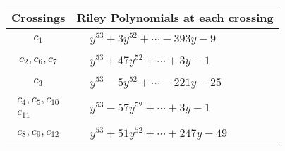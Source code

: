 \documentclass[1p]{elsarticle_modified}
\theoremstyle{definition}
\begin{document}
\begin{tabular}{m{50pt}|m{274pt}}
Crossings & \hspace{64pt}Riley Polynomials at each crossing \\
\hline $$\begin{aligned}c_{1}\end{aligned}$$&$\begin{aligned}
&y^{53}+3 y^{52}+\cdots-393 y-9
\end{aligned}$\\
\hline $$\begin{aligned}c_{2},c_{6},c_{7}\end{aligned}$$&$\begin{aligned}
&y^{53}+47 y^{52}+\cdots+3 y-1
\end{aligned}$\\
\hline $$\begin{aligned}c_{3}\end{aligned}$$&$\begin{aligned}
&y^{53}-5 y^{52}+\cdots-221 y-25
\end{aligned}$\\
\hline $$\begin{aligned}c_{4},c_{5},c_{10}\\c_{11}\end{aligned}$$&$\begin{aligned}
&y^{53}-57 y^{52}+\cdots+3 y-1
\end{aligned}$\\
\hline $$\begin{aligned}c_{8},c_{9},c_{12}\end{aligned}$$&$\begin{aligned}
&y^{53}+51 y^{52}+\cdots+247 y-49
\end{aligned}$\\
\hline
\end{tabular}
\vskip 2pc
\end{document}

